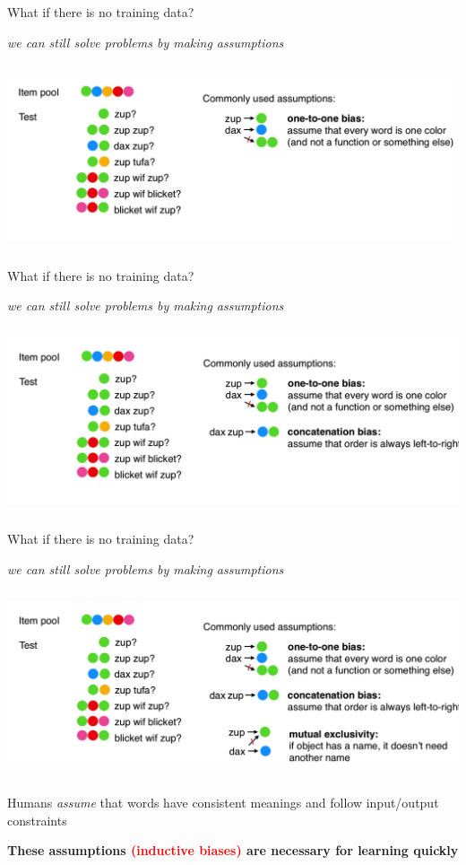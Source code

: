\begin{frame}{What if there is no training data?}
\centerline{\textit{we can still solve problems by making assumptions}}
\centering\includegraphics[height=5.5cm]{image/img192403.jpg}

\end{frame}
\begin{frame}{What if there is no training data?}
\centerline{\textit{we can still solve problems by making assumptions}}
\centering\includegraphics[height=5.5cm]{image/img192435.jpg}

\end{frame}
\begin{frame}{What if there is no training data?}
\centerline{\textit{we can still solve problems by making assumptions}}
\centering\includegraphics[height=5.5cm]{image/img192503.jpg}
\pause
\leavevmode\hphantom{ }

\small\centerline{Humans \textit{assume} that words have consistent meanings and follow input/output constraints}
\pause
\small\centerline{\textbf{These assumptions \textcolor{red}{(inductive biases)} are necessary for learning quickly}}
\end{frame}

